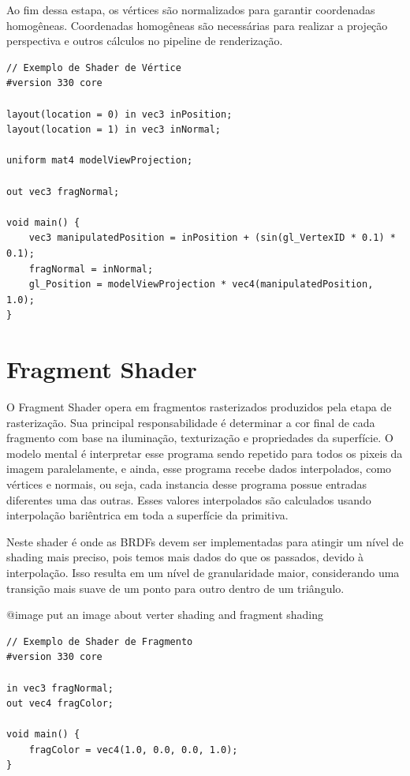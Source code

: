 \documentclass[english, 
               brazil, 
               bsc] %
               {dcomp-abntex2}
\begin{document}
Ao fim dessa estapa, os vértices são normalizados para garantir coordenadas homogêneas. Coordenadas homogêneas são necessárias para realizar a projeção perspectiva e outros cálculos no pipeline de renderização.


\begin{verbatim}
// Exemplo de Shader de Vértice
#version 330 core

layout(location = 0) in vec3 inPosition;
layout(location = 1) in vec3 inNormal;

uniform mat4 modelViewProjection;

out vec3 fragNormal;

void main() {
    vec3 manipulatedPosition = inPosition + (sin(gl_VertexID * 0.1) * 0.1);
    fragNormal = inNormal;
    gl_Position = modelViewProjection * vec4(manipulatedPosition, 1.0);
}
\end{verbatim}

\section{Fragment Shader}

O Fragment Shader opera em fragmentos rasterizados produzidos pela etapa de rasterização. Sua principal responsabilidade é determinar a cor final de cada fragmento com base na iluminação, texturização e propriedades da superfície. O modelo mental é interpretar esse programa  sendo repetido para todos os pixeis da imagem paralelamente, e ainda, esse programa recebe dados interpolados, como vértices e normais, ou seja, cada instancia desse programa possue entradas diferentes uma das outras. Esses valores interpolados são calculados usando interpolação bariêntrica em toda a superfície da primitiva.

Neste shader é onde as BRDFs devem ser implementadas para atingir um nível de shading mais preciso, pois temos mais dados do que os passados, devido à interpolação. Isso resulta em um nível de granularidade maior, considerando uma transição mais suave de um ponto para outro dentro de um triângulo.

@image{ put an image about verter shading and fragment shading}

\begin{verbatim}
// Exemplo de Shader de Fragmento
#version 330 core

in vec3 fragNormal;
out vec4 fragColor;

void main() {
    fragColor = vec4(1.0, 0.0, 0.0, 1.0); 
}
\end{verbatim}
\end{document}
